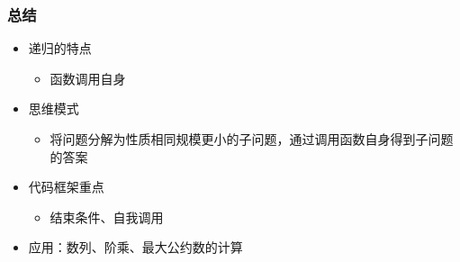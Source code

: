 \begin{frame}[fragile]
    \frametitle{总结}
    \begin{itemize}
        \item 递归的特点
        \begin{itemize}
            \item 函数调用自身
        \end{itemize}
        \item 思维模式
        \begin{itemize}
            \item 将问题分解为性质相同规模更小的子问题，通过调用函数自身得到子问题的答案
        \end{itemize}
        \item 代码框架重点
        \begin{itemize}
            \item 结束条件、自我调用
        \end{itemize}
        \item 应用：数列、阶乘、最大公约数的计算
    \end{itemize}

\end{frame}

